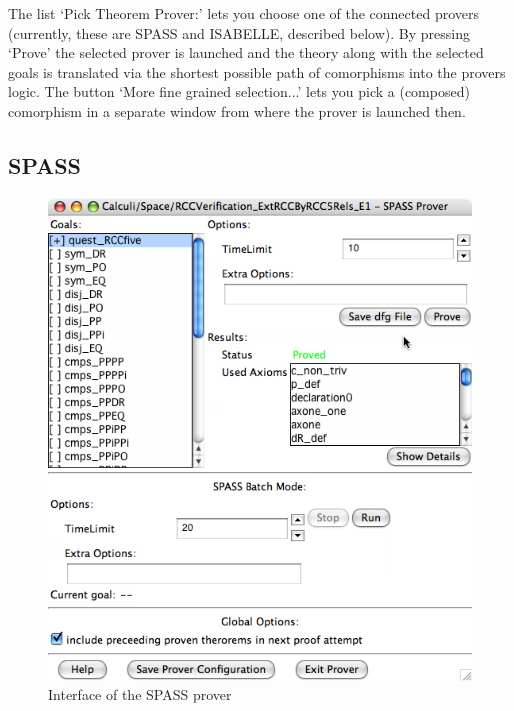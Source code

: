 \documentclass{article}
\newcommand{\normalTEXTSC}[2]{{#1\scriptsize#2}}
\newcommand     {\Isabelle}{\normalTEXTSC{I}{SABELLE}\xspace}
\begin{document}
The list `Pick Theorem Prover:' lets you choose one of the connected
provers (currently, these are SPASS and \Isabelle, described below). By
pressing `Prove' the selected prover is launched and the theory along
with the selected goals is translated via the shortest possible path
of comorphisms into the provers logic. The button `More fine grained
selection...' lets you pick a (composed) comorphism in a separate
window from where the prover is launched then.



\subsection*{SPASS}

\begin{figure}
\centering
\includegraphics[width=\textwidth]{spassGUI1}
\caption{Interface of the SPASS prover\label{fig:SPASS_GUI}}
\end{figure}
\end{document}
